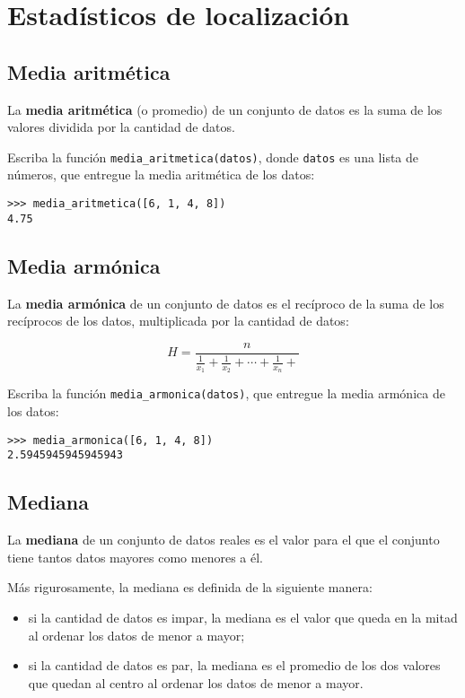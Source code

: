 \section{Estadísticos de localización}

\subsection{Media aritmética}

La \textbf{media aritmética} (o promedio) de un conjunto de datos es la
suma de los valores dividida por la cantidad de datos.

Escriba la función \lstinline!media_aritmetica(datos)!, donde
\lstinline!datos! es una lista de números, que entregue la media
aritmética de los datos:

\begin{lstlisting}
>>> media_aritmetica([6, 1, 4, 8])
4.75
\end{lstlisting}

\subsection{Media armónica}

La \textbf{media armónica} de un conjunto de datos es el recíproco de la
suma de los recíprocos de los datos, multiplicada por la cantidad de
datos:

\[H = \frac{n}{
\frac{1}{x_1} +
\frac{1}{x_2} +
\cdots +
\frac{1}{x_n} +
}\]

Escriba la función \lstinline!media_armonica(datos)!, que entregue la
media armónica de los datos:

\begin{lstlisting}
>>> media_armonica([6, 1, 4, 8])
2.5945945945945943
\end{lstlisting}

\subsection{Mediana}

La \textbf{mediana} de un conjunto de datos reales es el valor para el
que el conjunto tiene tantos datos mayores como menores a él.

Más rigurosamente, la mediana es definida de la siguiente manera:

\begin{itemize}
\item
  si la cantidad de datos es impar, la mediana es el valor que queda en
  la mitad al ordenar los datos de menor a mayor;
\item
  si la cantidad de datos es par, la mediana es el promedio de los dos
  valores que quedan al centro al ordenar los datos de menor a mayor.
\end{itemize}

